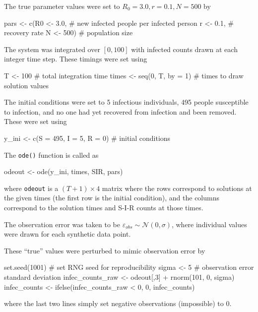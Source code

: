     The true parameter values were set to $R_0 = 3.0, r = 0.1, N = 500$ by

    \begin{R}
    pars  <- c(R0  <- 3.0,  # new infected people per infected person
              r   <- 0.1,  # recovery rate
              N   <- 500)  # population size
    \end{R}

    The system was integrated over $[0,100]$ with infected counts drawn at each integer time step. These timings were set using

    \begin{R}
    T <- 100                            # total integration time
    times <- seq(0, T, by = 1)          # times to draw solution values
    \end{R}

    The initial conditions were set to 5 infectious individuals, 495 people susceptible to infection, and no one had yet recovered from infection and been removed. These were set using

    \begin{R}
    y_ini <- c(S = 495, I = 5, R = 0)   # initial conditions
    \end{R}

    The \verb|ode()| function is called as

    \begin{R}
    odeout <- ode(y_ini, times, SIR, pars)
    \end{R}

    where \verb|odeout| is a $(T+1) \times 4$ matrix where the rows correspond to solutions at the given times (the first row is the initial condition), and the columns correspond to the solution times and S-I-R counts at those times.

    The observation error was taken to be $\varepsilon_{obs} \sim \mathcal{N}(0,\sigma)$, where individual values were drawn for each synthetic data point.

    These ``true'' values were perturbed to mimic observation error by

    \begin{R}
    set.seed(1001)  # set RNG seed for reproducibility
    sigma <- 5       # observation error standard deviation
    infec_counts_raw <- odeout[,3] + rnorm(101, 0, sigma)
    infec_counts     <- ifelse(infec_counts_raw < 0, 0, infec_counts)
    \end{R}

    where the last two lines simply set negative observations (impossible) to 0.


